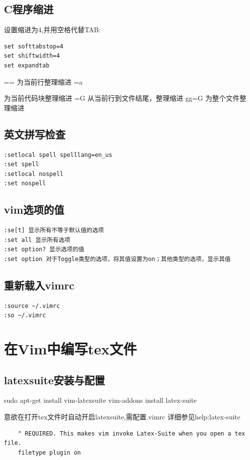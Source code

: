 \subsection{C程序缩进}
设置缩进为4,并用空格代替TAB:
\begin{verbatim}
set softtabstop=4
set shiftwidth=4
set expandtab
\end{verbatim}
== 为当前行整理缩进
=a{ 为当前代码块整理缩进
=G 从当前行到文件结尾，整理缩进
gg=G 为整个文件整理缩进


\subsection{英文拼写检查}
\begin{verbatim}
:setlocal spell spelllang=en_us 
:set spell
:setlocal nospell
:set nospell
\end{verbatim}


\subsection{vim选项的值}
\begin{verbatim}
:se[t] 显示所有不等于默认值的选项
:set all 显示所有选项
:set option? 显示选项的值
:set option 对于Toggle类型的选项，将其值设置为on；其他类型的选项，显示其值
\end{verbatim}

\subsection{重新载入vimrc}
\begin{verbatim}
:source ~/.vimrc
:so ~/.vimrc
\end{verbatim}


\section{在Vim中编写tex文件}

\subsection{latexsuite安装与配置}
\begin{shellcmd}
	sudo apt-get install vim-latexsuite
	vim-addons install latex-suite
\end{shellcmd}
意欲在打开tex文件时自动开启latexsuite,需配置.vimrc
详细参见help:latex-suite
\begin{verbatim}
    " REQUIRED. This makes vim invoke Latex-Suite when you open a tex file.
    filetype plugin on
    

\end{verbatim}}
